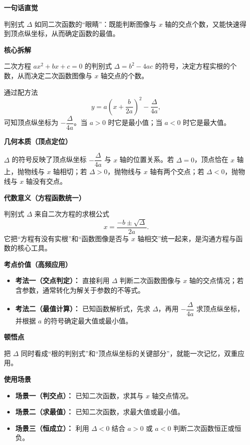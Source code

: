 \begin{explanationbox}
	\textbf{\textcolor{CExplanation}{一句话直觉}}

	判别式 $\Delta$ 如同二次函数的“眼睛”：既能判断图像与 $x$ 轴的交点个数，又能快速得到顶点纵坐标，从而确定函数的最值。

	\medskip
	\textbf{\textcolor{CExplanation}{核心拆解}}
	\begin{description}[style=nextline, leftmargin=2.8em, labelsep=0.5em, itemsep=0.45em]
		\item[\textbf{要点一（判定根个数）：}]
		      二次方程 $ax^2+bx+c=0$ 的判别式 $\Delta=b^2-4ac$ 的符号，决定方程实根的个数，从而决定二次函数图像与 $x$ 轴交点的个数。
		\item[\textbf{要点二（导出最值）：}]
		      通过配方法
		      \[
			      y=a\left(x+\dfrac{b}{2a}\right)^2-\dfrac{\Delta}{4a},
		      \]
		      可知顶点纵坐标为 $-\dfrac{\Delta}{4a}$。当 $a>0$ 时它是最小值；当 $a<0$ 时它是最大值。
	\end{description}

	\medskip
	\textbf{\textcolor{CExplanation}{几何本质（顶点定位）}}

	$\Delta$ 的符号反映了顶点纵坐标 $-\dfrac{\Delta}{4a}$ 与 $x$ 轴的位置关系。若 $\Delta=0$，顶点恰在 $x$ 轴上，抛物线与 $x$ 轴相切；若 $\Delta>0$，抛物线与 $x$ 轴有两个交点；若 $\Delta<0$，抛物线与 $x$ 轴没有交点。

	\medskip
	\textbf{\textcolor{CExplanation}{代数意义（方程函数统一）}}

	判别式 $\Delta$ 来自二次方程的求根公式
	\[
		x=\dfrac{-b\pm\sqrt{\Delta}}{2a}.
	\]
	它把“方程有没有实根”和“函数图像是否与 $x$ 轴相交”统一起来，是沟通方程与函数的核心工具。

	\medskip
	\textbf{\textcolor{CExplanation}{考点价值（高频应用）}}
	\begin{itemize}[leftmargin=*, itemsep=0.5em, topsep=0.4em]
		\item \textbf{考法一（交点判定）：} 直接利用 $\Delta$ 判断二次函数图像与 $x$ 轴的交点情况；若含参数，通常转化为解关于参数的不等式。
		\item \textbf{考法二（最值计算）：} 已知函数解析式，先求 $\Delta$，再用 $-\dfrac{\Delta}{4a}$ 求顶点纵坐标，并根据 $a$ 的符号确定最大值或最小值。
	\end{itemize}

	\medskip
	\textbf{\textcolor{CExplanation}{顿悟点}}

	把 $\Delta$ 同时看成“根的判别式”和“顶点纵坐标的关键部分”，就能一次记忆，双重应用。

	\medskip
	\textbf{\textcolor{CExplanation}{使用场景}}
	\begin{itemize}[leftmargin=*, itemsep=0.5em, topsep=0.4em]
		\item \textbf{场景一（判交点）：} 已知二次函数，求其与 $x$ 轴交点情况。
		\item \textbf{场景二（求最值）：} 已知二次函数，求最大值或最小值。
		\item \textbf{场景三（恒成立）：} 利用 $\Delta<0$ 结合 $a>0$ 或 $a<0$ 判断二次函数恒正或恒负。
	\end{itemize}
\end{explanationbox}